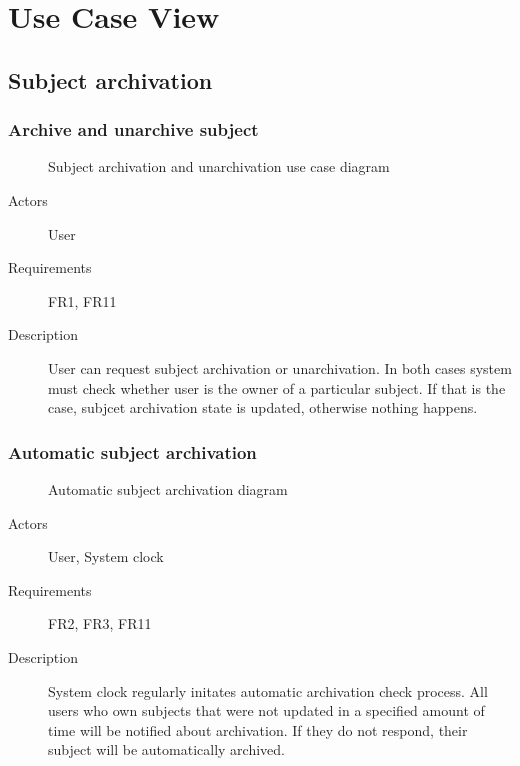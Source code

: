 \documentclass[
    english, %
]{VUMIFPSkursinis}
\begin{document}
\section{Use Case View}

\subsection{Subject archivation}

\subsubsection{Archive and unarchive subject}

\begin{figure}[ht]
    \centering
    
    \label{archivation-use-case}
    \caption{Subject archivation and unarchivation use case diagram}
\end{figure}

\begin{description}
    \item[Actors] User
    \item[Requirements] FR1, FR11
    \item[Description] User can request subject archivation or unarchivation. In both cases system must check whether user is the owner of a particular subject. If that is the case, subjcet archivation state is updated, otherwise nothing happens.
\end{description}

\subsubsection{Automatic subject archivation}

\begin{figure}[ht]
    \centering
    
    \label{automatic-archivation-use-case}
    \caption{Automatic subject archivation diagram}
\end{figure}

\begin{description}
    \item[Actors] User, System clock
    \item[Requirements] FR2, FR3, FR11
    \item[Description] System clock regularly initates automatic archivation check process. All users who own subjects that were not updated in a specified amount of time will be notified about archivation. If they do not respond, their subject will be automatically archived.
\end{description}
\end{document}
